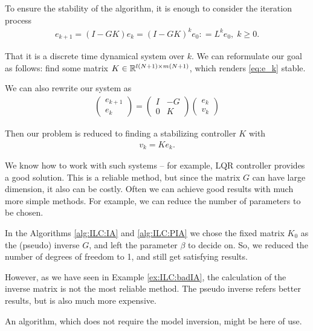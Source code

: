 To ensure the stability of the algorithm, it is enough to consider the iteration process 
\begin{align}
\label{eq:e_k}
e_{k+1} = (I - G K) e_k = (I - G K)^k e_0  : =  L^k e_{0}, \; k \geq 0.
\end{align}

That it is a discrete time dynamical system over $k$. We can reformulate our goal as follows: find some matrix $K \in {\mathbb{R}}^{l(N+1) \times m (N+1)}$, which renders \eqref{eq:e_k} stable. %

We can also rewrite our system as
\begin{align}
\label{eq:ILC:e_kPlant}
\begin{pmatrix}
e_{k+1} \\ e_k
\end{pmatrix} = 
\left(
\begin{array}{c|c}
I & -G \\\hline 0 & K
\end{array}\right) \begin{pmatrix}
e_k \\ v_k 
\end{pmatrix}
\end{align}

Then our problem is reduced to finding a stabilizing controller $K$  with 
\begin{align}
v_k = K e_k.
\end{align} 

We know how to work with such systems -- for example, LQR controller provides a good solution. This is a reliable method, but since the matrix $G$ can have large dimension, it also can be costly. Often we can achieve good results with much more simple methods. For example, we can reduce the number of parameters to be chosen. 

In the Algorithms \ref{alg:ILC:IA} and \ref{alg:ILC:PIA} we chose the fixed matrix $K_0$ as the (pseudo) inverse $G$, and left the parameter $\beta$ to decide on. So, we reduced the number of degrees of freedom to 1, and still get satisfying results.


However, as we have seen in Example \ref{ex:ILC:badIA}, the calculation of the  inverse matrix is not the most reliable method. The pseudo inverse refers better results, but is also much more expensive. 

An algorithm, which does not require the model inversion, might be here of use. 

